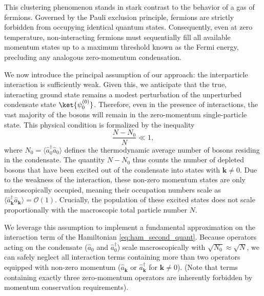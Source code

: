 \begin{remark}
    This clustering phenomenon stands in stark contrast to the behavior of a gas of fermions. Governed by the Pauli exclusion principle, fermions are strictly forbidden from occupying identical quantum states. Consequently, even at zero temperature, non-interacting fermions must sequentially fill all available momentum states up to a maximum threshold known as the Fermi energy, precluding any analogous zero-momentum condensation.
\end{remark}

We now introduce the principal assumption of our approach: the interparticle interaction is sufficiently weak. Given this, we anticipate that the true, interacting ground state remains a modest perturbation of the unperturbed condensate state \( \ket{\psi_0^{(0)}} \). Therefore, even in the presence of interactions, the vast majority of the bosons will remain in the zero-momentum single-particle state. This physical condition is formalized by the inequality
\begin{equation} \label{eq:weak_interaction_condition}
    \frac{N - N_0}{N} \ll 1,
\end{equation}
where \( N_0 = \langle \hat{a}^\dagger_0 \hat{a}_0 \rangle \) defines the thermodynamic average number of bosons residing in the condensate. The quantity \( N - N_0 \) thus counts the number of depleted bosons that have been excited out of the condensate into states with \( \mathbf{k} \neq 0 \). Due to the weakness of the interaction, these non-zero momentum states are only microscopically occupied, meaning their occupation numbers scale as \( \langle \hat{a}^\dagger_{\mathbf{k}} \hat{a}_{\mathbf{k}} \rangle = \mathcal{O}(1) \). Crucially, the population of these excited states does not scale proportionally with the macroscopic total particle number \( N \).

We leverage this assumption to implement a fundamental approximation on the interaction term of the Hamiltonian \eqref{eq:ham_second_quant}. Because operators acting on the condensate (\( \hat{a}_0 \) and \( \hat{a}^\dagger_0 \)) scale macroscopically with \( \sqrt{N_0} \approx \sqrt{N} \), we can safely neglect all interaction terms containing more than two operators equipped with non-zero momentum (\( \hat{a}_{\mathbf{k}} \) or \( \hat{a}^\dagger_{\mathbf{k}} \) for \( \mathbf{k} \neq 0 \)). (Note that terms containing exactly three zero-momentum operators are inherently forbidden by momentum conservation requirements).

